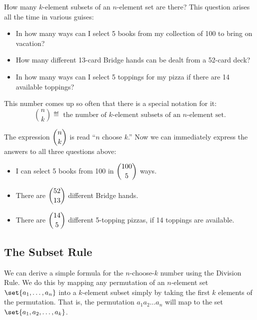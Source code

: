 
How many $k$-element subsets of an $n$-element set are there?  This
question arises all the time in various guises:

\begin{itemize}

\item In how many ways can I select 5 books from my collection of 100
to bring on vacation?

\item How many different 13-card Bridge hands can be dealt from a
52-card deck?

\item In how many ways can I select 5 toppings for my pizza if there
are 14 available toppings?

\end{itemize}

This number comes up so often that there is a special notation for it:
\[
\binom{n}{k} \eqdef \text{ the number of $k$-element subsets of an $n$-element set.}
\]

The expression $\dbinom{n}{k}$ is read ``$n$ choose $k$.''  Now we can
immediately express the answers to all three questions above:

\begin{itemize}

\item I can select 5 books from 100 in $\dbinom{100}{5}$ ways.

\item There are $\dbinom{52}{13}$ different Bridge hands.

\item There are $\dbinom{14}{5}$ different 5-topping pizzas, if 14
toppings are available.

\end{itemize}

\subsection{The Subset Rule}

We can derive a simple formula for the $n$-choose-$k$ number using the
Division Rule.  We do this by mapping any permutation of an $n$-element
set $\set{a_1,\dots, a_n}$ into a $k$-element subset simply by taking the
first $k$ elements of the permutation.  That is, the permutation
$a_1a_2\dots a_n$ will map to the set $\set{a_1,a_2,\dots,a_k}$.

